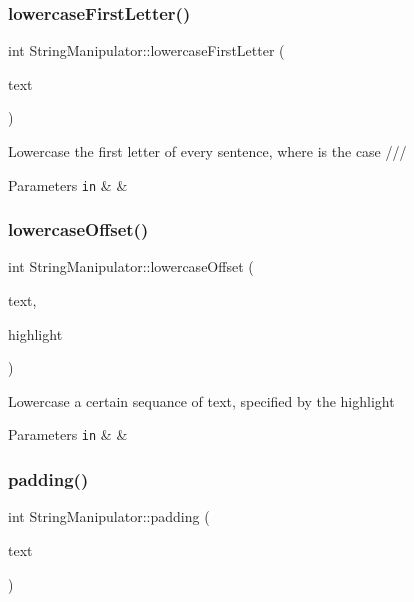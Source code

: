 \subsubsection{\texorpdfstring{lowercase\+First\+Letter()}{lowercaseFirstLetter()}}
{\footnotesize\ttfamily int String\+Manipulator\+::lowercase\+First\+Letter (\begin{DoxyParamCaption}\item[{std\+::string \&}]{text }\end{DoxyParamCaption})\hspace{0.3cm}{\ttfamily [static]}}

Lowercase the first letter of every sentence, where is the case /// 
\begin{DoxyParams}[1]{Parameters}
\mbox{\tt in}  & {\em } & \\
\hline
\end{DoxyParams}
\mbox{\label{class_string_manipulator_ae02eefd357a9e6442021f9f49a42d959}} 
\subsubsection{\texorpdfstring{lowercase\+Offset()}{lowercaseOffset()}}
{\footnotesize\ttfamily int String\+Manipulator\+::lowercase\+Offset (\begin{DoxyParamCaption}\item[{std\+::string \&}]{text,  }\item[{const \hyperlink{class_text_high_light}{Text\+High\+Light}}]{highlight }\end{DoxyParamCaption})\hspace{0.3cm}{\ttfamily [static]}}

Lowercase a certain sequance of text, specified by the highlight


\begin{DoxyParams}[1]{Parameters}
\mbox{\tt in}  & {\em } & \\
\hline
\end{DoxyParams}
\mbox{\label{class_string_manipulator_a03ee428eed1a526be0382c0c7ae297dd}} 
\subsubsection{\texorpdfstring{padding()}{padding()}}
{\footnotesize\ttfamily int String\+Manipulator\+::padding (\begin{DoxyParamCaption}\item[{std\+::string \&}]{text }\end{DoxyParamCaption})\hspace{0.3cm}{\ttfamily [static]}}

